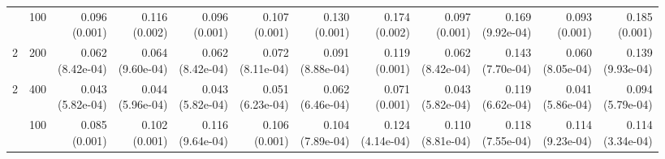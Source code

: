 \begin{table}[p]
{\begin{tabular}{llrrrrrrrrrr}
\addlinespace
2 & 100 & \shortstack{0.096\\(0.001)} & \shortstack{0.116\\(0.002)} & \shortstack{0.096\\(0.001)} & \shortstack{0.107\\(0.001)} & \shortstack{0.130\\(0.001)} & \shortstack{0.174\\(0.002)} & \shortstack{0.097\\(0.001)} & \shortstack{0.169\\(9.92e-04)} & \shortstack{0.093\\(0.001)} & \shortstack{0.185\\(0.001)} \\
2 & 200 & \shortstack{0.062\\(8.42e-04)} & \shortstack{0.064\\(9.60e-04)} & \shortstack{0.062\\(8.42e-04)} & \shortstack{0.072\\(8.11e-04)} & \shortstack{0.091\\(8.88e-04)} & \shortstack{0.119\\(0.001)} & \shortstack{0.062\\(8.42e-04)} & \shortstack{0.143\\(7.70e-04)} & \shortstack{0.060\\(8.05e-04)} & \shortstack{0.139\\(9.93e-04)} \\
2 & 400 & \shortstack{0.043\\(5.82e-04)} & \shortstack{0.044\\(5.96e-04)} & \shortstack{0.043\\(5.82e-04)} & \shortstack{0.051\\(6.23e-04)} & \shortstack{0.062\\(6.46e-04)} & \shortstack{0.071\\(0.001)} & \shortstack{0.043\\(5.82e-04)} & \shortstack{0.119\\(6.62e-04)} & \shortstack{0.041\\(5.86e-04)} & \shortstack{0.094\\(5.79e-04)} \\
\addlinespace
3 & 100 & \shortstack{0.085\\(0.001)} & \shortstack{0.102\\(0.001)} & \shortstack{0.116\\(9.64e-04)} & \shortstack{0.106\\(0.001)} & \shortstack{0.104\\(7.89e-04)} & \shortstack{0.124\\(4.14e-04)} & \shortstack{0.110\\(8.81e-04)} & \shortstack{0.118\\(7.55e-04)} & \shortstack{0.114\\(9.23e-04)} & \shortstack{0.114\\(3.34e-04)} \\

\end{tabular}}
\end{table}

